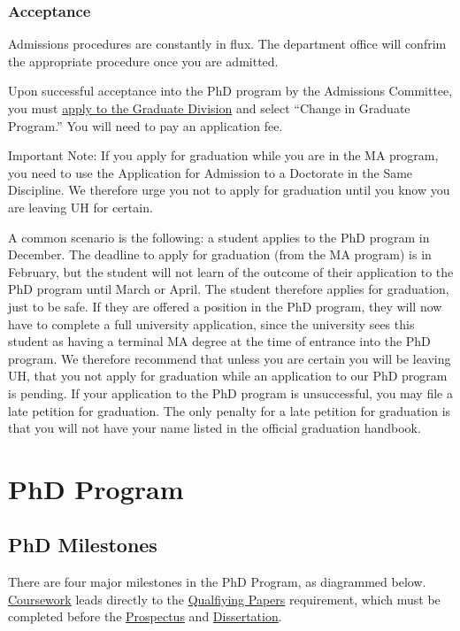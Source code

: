 \documentclass[
]{book}
\begin{document}
\section{Acceptance}\label{acceptance}

Admissions procedures are constantly in flux. The department office will confrim the appropriate procedure once you are admitted.

Upon successful acceptance into the PhD program by the Admissions Committee, you must \href{https://manoa.hawaii.edu/graduate/masters-to-phd/}{apply to the Graduate Division} and select ``Change in Graduate Program.'' You will need to pay an application fee.

Important Note: If you apply for graduation while you are in the MA program, you need to use the Application for Admission to a Doctorate in the Same Discipline. We therefore urge you not to apply for graduation until you know you are leaving UH for certain.

A common scenario is the following: a student applies to the PhD program in December. The deadline to apply for graduation (from the MA program) is in February, but the student will not learn of the outcome of their application to the PhD program until March or April. The student therefore applies for graduation, just to be safe. If they are offered a position in the PhD program, they will now have to complete a full university application, since the university sees this student as having a terminal MA degree at the time of entrance into the PhD program. We therefore recommend that unless you are certain you will be leaving UH, that you not apply for graduation while an application to our PhD program is pending. If your application to the PhD program is unsuccessful, you may file a late petition for graduation. The only penalty for a late petition for graduation is that you will not have your name listed in the official graduation handbook.

\part*{PhD Program}\label{part-phd-program}

\chapter{PhD Milestones}\label{phdprogram}

There are four major milestones in the PhD Program, as diagrammed below. \hyperref[phdcoursework]{Coursework} leads directly to the \hyperref[qp]{Qualfiying Papers} requirement, which must be completed before the \hyperref[prospectus]{Prospectus} and \hyperref[dissertation]{Dissertation}.
\end{document}
